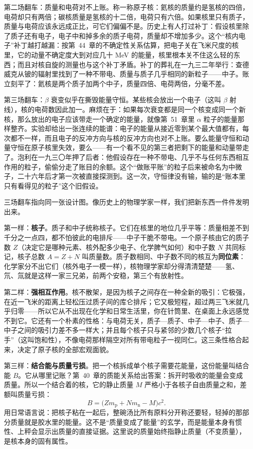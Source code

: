 第二场翻车：质量和电荷对不上账。称一称原子核：氦核的质量约是氢核的四倍，电荷却只有两倍；碳核质量是氢核的十二倍，电荷只有六倍。如果核里只有质子，质量与电荷应该永远成正比，可它们偏偏不是。历史上有人打过补丁：假设核里除了质子还有电子，电子中和掉多余的质子电荷，质量却不增加多少。这个“核内电子”补丁越打越漏：按第~44~章的不确定性关系估算，把电子关在飞米尺度的核里，它的动量不确定度大到对应几十 MeV 的能量，核里根本关不住这么轻的东西；而且对核自旋的测量也与这个补丁矛盾。补丁的葬礼在一九三二年举行：查德威克从铍的辐射里找到了一种不带电、质量与质子几乎相同的新粒子——中子。账立刻平了：氦核是两个质子加两个中子，质量四倍、电荷两倍，分毫不差。

第三场翻车：\(\beta\) 衰变似乎在撕毁能量守恒。某些核会放出一个电子（这叫 \(\beta\) 射线），核的电荷数因此加一。麻烦在于：如果每次衰变都是同一个核变成同一个新核，那么放出的电子应该带走一个确定的能量，就像第~51~章里 \(\alpha\) 粒子的能量那样整齐。实验却给出一张连续的能谱：电子的能量从接近零到某个最大值都有，每次都不一样，而且电子的反冲方向与核的反冲方向也对不上账。要么能量守恒和动量守恒在原子核里失效，要么——有一个看不见的第三者把剩下的能量和动量带走了。泡利在一九三〇年押了后者：他假设存在一种不带电、几乎不与任何东西相互作用的粒子，偷偷分走了账目的余额。这个“做账平账”的粒子后来被命名为中微子，二十六年后才第一次被直接探测到。这一次，守恒律没有输，输的是“账本里只有看得见的粒子”这个旧假设。


三场翻车指向同一张设计图。像历史上的物理学家一样，我们把新东西一件件发明出来。

第一样：\textbf{核子}。质子和中子统称核子。它们在核里的地位几乎平等：质量相差不到千分之一点四，都不怕彼此的电排斥——中子干脆不带电。一个原子核由它的质子数 \(Z\)（决定它是哪种元素、核外配多少电子、化学脾气如何）和中子数 \(N\) 共同标记，核子总数 \(A=Z+N\) 叫质量数。质子数相同、中子数不同的核互为\textbf{同位素}：化学家分不出它们（核外电子一模一样），核物理学家却分得清清楚楚——氢、氘、氚就是这样一家三兄弟，前两个安稳，第三个有放射性。

第二样：\textbf{强相互作用}。核不散架，是因为核子之间存在一种全新的吸引：它极强，在近一飞米的距离上轻松压过质子间的库仑排斥；它又极短程，超过两三飞米就几乎归零——所以它从不出现在化学和日常生活里，你在针筒里、在桌面上永远感觉不到它。它还有一个朴素的性格：与电荷无关，质子—质子、中子—中子、质子—中子之间的吸引力差不多一样大；并且每个核子只与紧邻的少数几个核子“拉手”（这叫饱和性），不像电荷那样隔空对所有带电粒子一视同仁。这三条性格合起来，决定了原子核的全部宏观面貌。

第三样：\textbf{结合能与质量亏损}。把一个核拆成单个核子需要花能量，这份能量叫结合能 \(B\)。它从哪里记账？第~40~章的质能关系给出答案：拆开时吸收的能量会变成质量。所以一个结合着的核，它的静止质量 \(M\) 严格小于各核子自由质量之和，差额叫质量亏损：
\[
B=\bigl(Zm_{\mathrm p}+Nm_{\mathrm n}-M\bigr)c^{2}.
\]
用日常语言说：把核子粘在一起后，整碗汤比所有原料分开称还要轻，轻掉的那部分质量就是胶水里的能量。这不是“质量变成了能量”的玄学，而是能量本身有惯性、上秤会显示出质量的直接证据。这里说的质量始终指静止质量（不变质量），是核本身的固有属性。

